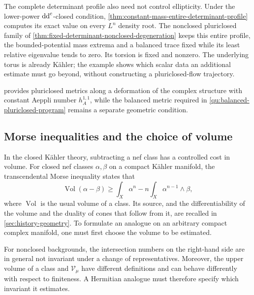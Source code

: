 The complete determinant profile also need not control ellipticity. Under the lower-power $\mathrm{dd}^{\mathrm{c}}$-closed condition, \cref{thm:constant-mass-entire-determinant-profile} computes its exact value on every $L^n$ density root. The nonclosed pluriclosed family of \cref{thm:fixed-determinant-nonclosed-degeneration} keeps this entire profile, the bounded-potential mass extrema and a balanced trace fixed while its least relative eigenvalue tends to zero. Its torsion is fixed and nonzero. The underlying torus is already K\"ahler; the example shows which scalar data an additional estimate must go beyond, without constructing a pluriclosed-flow trajectory.

 provides pluriclosed metrics along a deformation of the complex structure with constant Aeppli number $h_A^{1,1}$, while the balanced metric required in \cref{qu:balanced-pluriclosed-program} remains a separate geometric condition.

\subsection{Morse inequalities and the choice of volume}

In the closed K\"ahler theory, subtracting a nef class has a controlled cost in volume. For closed nef classes $\alpha,\beta$ on a compact K\"ahler manifold, the transcendental Morse inequality states that
\[
 \operatorname{Vol}(\alpha-\beta)
 \geq\int_X\alpha^n-n\int_X\alpha^{n-1}\wedge\beta,
\]
where $\operatorname{Vol}$ is the usual volume of a class. Its source, and the differentiability of the volume and the duality of cones that follow from it, are recalled in \cref{sec:history-geometry}. To formulate an analogue on an arbitrary compact complex manifold, one must first choose the volume to be estimated.

For nonclosed backgrounds, the intersection numbers on the right-hand side are in general not invariant under a change of representatives. Moreover, the upper volume of a class and $\mathcal V_\mu$ have different definitions and can behave differently with respect to finiteness. A Hermitian analogue must therefore specify which invariant it estimates.

